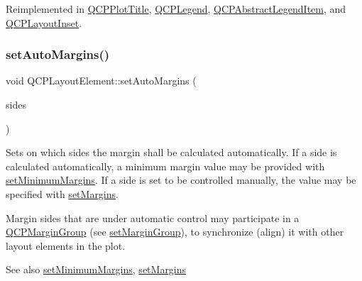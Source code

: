 Reimplemented in \hyperlink{class_q_c_p_plot_title_aae4bcb2401e6947ea0abd3c960488d35}{Q\+C\+P\+Plot\+Title}, \hyperlink{class_q_c_p_legend_acd7be544c81324e391cfa6be9c413c01}{Q\+C\+P\+Legend}, \hyperlink{class_q_c_p_abstract_legend_item_ac834bf9003c491e5064a31e2a7de418d}{Q\+C\+P\+Abstract\+Legend\+Item}, and \hyperlink{class_q_c_p_layout_inset_afcd56d5d1b8853838cdc535f1904f68a}{Q\+C\+P\+Layout\+Inset}.

\hypertarget{class_q_c_p_layout_element_accfda49994e3e6d51ed14504abf9d27d}{}\label{class_q_c_p_layout_element_accfda49994e3e6d51ed14504abf9d27d} 
\subsubsection{\texorpdfstring{set\+Auto\+Margins()}{setAutoMargins()}}
{\footnotesize\ttfamily void Q\+C\+P\+Layout\+Element\+::set\+Auto\+Margins (\begin{DoxyParamCaption}\item[{Q\+C\+P\+::\+Margin\+Sides}]{sides }\end{DoxyParamCaption})}

Sets on which sides the margin shall be calculated automatically. If a side is calculated automatically, a minimum margin value may be provided with \hyperlink{class_q_c_p_layout_element_a0a8a17abc16b7923159fcc7608f94673}{set\+Minimum\+Margins}. If a side is set to be controlled manually, the value may be specified with \hyperlink{class_q_c_p_layout_element_a8f450b1f3f992ad576fce2c63d8b79cf}{set\+Margins}.

Margin sides that are under automatic control may participate in a \hyperlink{class_q_c_p_margin_group}{Q\+C\+P\+Margin\+Group} (see \hyperlink{class_q_c_p_layout_element_a516e56f76b6bc100e8e71d329866847d}{set\+Margin\+Group}), to synchronize (align) it with other layout elements in the plot.

\begin{DoxySeeAlso}{See also}
\hyperlink{class_q_c_p_layout_element_a0a8a17abc16b7923159fcc7608f94673}{set\+Minimum\+Margins}, \hyperlink{class_q_c_p_layout_element_a8f450b1f3f992ad576fce2c63d8b79cf}{set\+Margins} 
\end{DoxySeeAlso}
\hypertarget{class_q_c_p_layout_element_a516e56f76b6bc100e8e71d329866847d}{}\label{class_q_c_p_layout_element_a516e56f76b6bc100e8e71d329866847d} 
